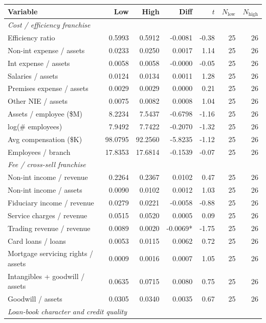 \begin{tabular}{lrrrrrr}
\toprule
Variable & Low & High & Diff & $t$ & $N_{\text{low}}$ & $N_{\text{high}}$ \\
\midrule
\multicolumn{7}{l}{\emph{Cost / efficiency franchise}} \\
\midrule
Efficiency ratio & 0.5993 & 0.5912 & -0.0081 & -0.38 & 25 & 26 \\
Non-int expense / assets & 0.0233 & 0.0250 & 0.0017 & 1.14 & 25 & 26 \\
Int expense / assets & 0.0058 & 0.0058 & -0.0000 & -0.05 & 25 & 26 \\
Salaries / assets & 0.0124 & 0.0134 & 0.0011 & 1.28 & 25 & 26 \\
Premises expense / assets & 0.0029 & 0.0029 & 0.0000 & 0.21 & 25 & 26 \\
Other NIE / assets & 0.0075 & 0.0082 & 0.0008 & 1.04 & 25 & 26 \\
Assets / employee (\$M) & 8.2234 & 7.5437 & -0.6798 & -1.16 & 25 & 26 \\
log(\# employees) & 7.9492 & 7.7422 & -0.2070 & -1.32 & 25 & 26 \\
Avg compensation (\$K) & 98.0795 & 92.2560 & -5.8235 & -1.12 & 25 & 26 \\
Employees / branch & 17.8353 & 17.6814 & -0.1539 & -0.07 & 25 & 26 \\
\midrule
\multicolumn{7}{l}{\emph{Fee / cross-sell franchise}} \\
\midrule
Non-int income / revenue & 0.2264 & 0.2367 & 0.0102 & 0.47 & 25 & 26 \\
Non-int income / assets & 0.0090 & 0.0102 & 0.0012 & 1.03 & 25 & 26 \\
Fiduciary income / revenue & 0.0279 & 0.0221 & -0.0058 & -0.88 & 25 & 26 \\
Service charges / revenue & 0.0515 & 0.0520 & 0.0005 & 0.09 & 25 & 26 \\
Trading revenue / revenue & 0.0089 & 0.0020 & -0.0069* & -1.75 & 25 & 26 \\
Card loans / loans & 0.0053 & 0.0115 & 0.0062 & 0.72 & 25 & 26 \\
Mortgage servicing rights / assets & 0.0009 & 0.0016 & 0.0007 & 1.05 & 25 & 26 \\
Intangibles + goodwill / assets & 0.0635 & 0.0715 & 0.0080 & 0.75 & 25 & 26 \\
Goodwill / assets & 0.0305 & 0.0340 & 0.0035 & 0.67 & 25 & 26 \\
\midrule
\multicolumn{7}{l}{\emph{Loan-book character and credit quality}} \\

\end{tabular}
